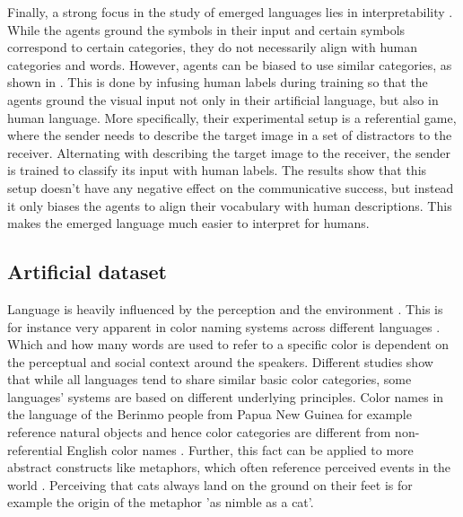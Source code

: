Finally, a strong focus in the study of emerged languages lies in interpretability \citep{Dessi2021,Lazaridou2017,Chaabouni2021}.
While the agents ground the symbols in their input and certain symbols correspond to certain categories, they do not necessarily align with human categories and words.
However, agents can be biased to use similar categories, as shown in \citep{Lazaridou2017}.
This is done by infusing human labels during training so that the agents ground the visual input not only in their artificial language, but also in human language.
More specifically, their experimental setup is a referential game, where the sender needs to describe the target image in a set of distractors to the receiver.
Alternating with describing the target image to the receiver, the sender is trained to classify its input with human labels.
The results show that this setup doesn't have any negative effect on the communicative success, but instead it only biases the agents to align their vocabulary with human descriptions.
This makes the emerged language much easier to interpret for humans.

\subsection{Artificial dataset}
Language is heavily influenced by the perception and the environment \citep{Hofstadter2013,Dobnik2017,Ji2022}.
This is for instance very apparent in color naming systems across different languages \citep{Zaslavsky2018}.
Which and how many words are used to refer to a specific color is dependent on the perceptual and social context around the speakers.
Different studies show that while all languages tend to share similar basic color categories, some languages' systems are based on different underlying principles.
Color names in the language of the Berinmo people from Papua New Guinea for example  reference natural objects and hence color categories are different from non-referential English color names \citep{Davidoff2001,Steels2005}.
Further, this fact can be applied to more abstract constructs like metaphors, which often reference perceived events in the world \citep{Lakoff1980}.
Perceiving that cats always land on the ground on their feet is for example the origin of the metaphor 'as nimble as a cat'.

